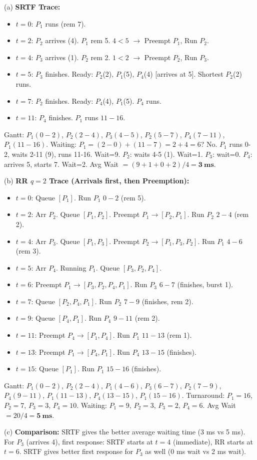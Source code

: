 \documentclass[11pt]{article}
\begin{document}
\begin{corrige}[Exercise 1]
(a) \textbf{SRTF Trace:}
\begin{itemize}
\item $t=0$: $P_1$ runs (rem 7).
\item $t=2$: $P_2$ arrives (4). $P_1$ rem 5. $4<5$ $\to$ Preempt $P_1$, Run $P_2$.
\item $t=4$: $P_3$ arrives (1). $P_2$ rem 2. $1<2$ $\to$ Preempt $P_2$, Run $P_3$.
\item $t=5$: $P_3$ finishes. Ready: $P_2$(2), $P_1$(5), $P_4$(4) [arrives at 5]. Shortest $P_2$(2) runs.
\item $t=7$: $P_2$ finishes. Ready: $P_4$(4), $P_1$(5). $P_4$ runs.
\item $t=11$: $P_4$ finishes. $P_1$ runs $11\!-\!16$.
\end{itemize}
Gantt: $P_1(0-2)$, $P_2(2-4)$, $P_3(4-5)$, $P_2(5-7)$, $P_4(7-11)$, $P_1(11-16)$.
Waiting: $P_1=(2-0)+(11-7)=2+4=6$? No. $P_1$ runs 0-2, waits 2-11 (9), runs 11-16. Wait=9. $P_2$: waits 4-5 (1). Wait=1. $P_3$: wait=0. $P_4$: arrives 5, starts 7. Wait=2. Avg Wait $= (9+1+0+2)/4 = \mathbf{3\ ms}$.

(b) \textbf{RR $q=2$ Trace (Arrivals first, then Preemption):}
\begin{itemize}
\item $t=0$: Queue $[P_1]$. Run $P_1$ $0\!-\!2$ (rem 5).
\item $t=2$: Arr $P_2$. Queue $[P_1, P_2]$. Preempt $P_1 \to [P_2, P_1]$. Run $P_2$ $2\!-\!4$ (rem 2).
\item $t=4$: Arr $P_3$. Queue $[P_1, P_3]$. Preempt $P_2 \to [P_1, P_3, P_2]$. Run $P_1$ $4\!-\!6$ (rem 3).
\item $t=5$: Arr $P_4$. Running $P_1$. Queue $[P_3, P_2, P_4]$.
\item $t=6$: Preempt $P_1 \to [P_3, P_2, P_4, P_1]$. Run $P_3$ $6\!-\!7$ (finishes, burst 1).
\item $t=7$: Queue $[P_2, P_4, P_1]$. Run $P_2$ $7\!-\!9$ (finishes, rem 2).
\item $t=9$: Queue $[P_4, P_1]$. Run $P_4$ $9\!-\!11$ (rem 2).
\item $t=11$: Preempt $P_4 \to [P_1, P_4]$. Run $P_1$ $11\!-\!13$ (rem 1).
\item $t=13$: Preempt $P_1 \to [P_4, P_1]$. Run $P_4$ $13\!-\!15$ (finishes).
\item $t=15$: Queue $[P_1]$. Run $P_1$ $15\!-\!16$ (finishes).
\end{itemize}
Gantt: $P_1(0-2)$, $P_2(2-4)$, $P_1(4-6)$, $P_3(6-7)$, $P_2(7-9)$, $P_4(9-11)$, $P_1(11-13)$, $P_4(13-15)$, $P_1(15-16)$.
Turnaround: $P_1=16$, $P_2=7$, $P_3=3$, $P_4=10$. Waiting: $P_1=9$, $P_2=3$, $P_3=2$, $P_4=6$. Avg Wait $= 20/4 = \mathbf{5\ ms}$.

(c) \textbf{Comparison:} SRTF gives the better average waiting time (3 ms vs 5 ms). For $P_3$ (arrives 4), first response: SRTF starts at $t=4$ (immediate), RR starts at $t=6$. SRTF gives better first response for $P_3$ as well (0 ms wait vs 2 ms wait).
\end{corrige}
\end{document}
